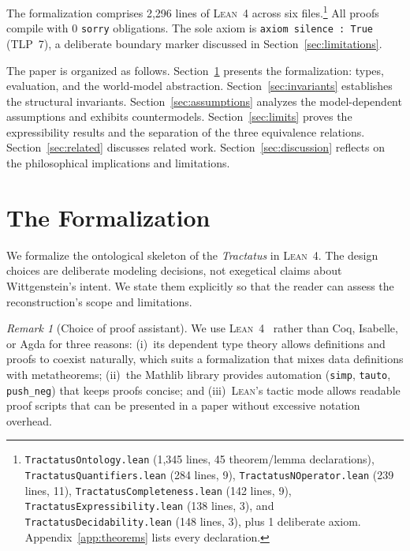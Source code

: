 \documentclass[jsl,bibother]{asl}
\theoremstyle{definition}
\theoremstyle{remark}
\newtheorem{remark}[theorem]{Remark}
\newcommand{\Lean}{\textsc{Lean}}
\begin{document}
\noindent
The formalization comprises 2,296 lines of \Lean~4 across six
files.\footnote{%
  \texttt{TractatusOntology.lean} (1,345 lines, 45 theorem/lemma
  declarations), \texttt{TractatusQuantifiers.lean} (284 lines, 9),
  \texttt{TractatusNOperator.lean} (239 lines, 11),
  \texttt{TractatusCompleteness.lean} (142 lines, 9),
  \texttt{TractatusExpressibility.lean} (138 lines, 3), and
  \texttt{TractatusDecidability.lean} (148 lines, 3), plus 1
  deliberate axiom.  Appendix~\ref{app:theorems} lists every
  declaration.}
All proofs compile with 0 \texttt{sorry} obligations.
The sole axiom is \texttt{axiom silence : True} (TLP~7), a
deliberate boundary marker discussed in
Section~\ref{sec:limitations}.

The paper is organized as follows.
Section~\ref{sec:formalization} presents the formalization:
types, evaluation, and the world-model abstraction.
Section~\ref{sec:invariants} establishes the structural
invariants.
Section~\ref{sec:assumptions} analyzes the model-dependent
assumptions and exhibits countermodels.
Section~\ref{sec:limits} proves the expressibility results and
the separation of the three equivalence relations.
Section~\ref{sec:related} discusses related work.
Section~\ref{sec:discussion} reflects on the philosophical
implications and limitations.

\section{The Formalization}
\label{sec:formalization}

We formalize the ontological skeleton of the \emph{Tractatus}
in \Lean~4.  The design choices are deliberate modeling
decisions, not exegetical claims about Wittgenstein's intent.
We state them explicitly so that the reader can assess the
reconstruction's scope and limitations.

\begin{remark}[Choice of proof assistant]
\label{rem:lean4}
We use \Lean~4~\cite{moura2021} rather than Coq, Isabelle, or
Agda for three reasons: (i)~its dependent type theory allows
definitions and proofs to coexist naturally, which suits a
formalization that mixes data definitions with metatheorems;
(ii)~the Mathlib library provides automation
(\texttt{simp}, \texttt{tauto}, \texttt{push\_neg}) that keeps
proofs concise; and (iii)~\Lean's tactic mode allows readable
proof scripts that can be presented in a paper without excessive
notation overhead.
\end{remark}
\end{document}
